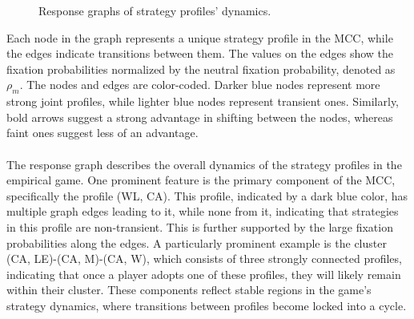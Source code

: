\begin{flushleft}
\begin{flushleft}
\begin{figure}[H]
            \caption{Response graphs of strategy profiles' dynamics.}
            \label{fig:response_graphs}
        \end{figure}

        Each node in the graph represents a unique strategy profile in the MCC, while the edges indicate transitions between them. The values on the edges show the fixation probabilities normalized by the neutral fixation probability, denoted as $\rho_m$. The nodes and edges are color-coded. Darker blue nodes represent more strong joint profiles, while lighter blue nodes represent transient ones. Similarly, bold arrows suggest a strong advantage in shifting between the nodes, whereas faint ones suggest less of an advantage.\\~\\

        The response graph describes the overall dynamics of the strategy profiles in the empirical game. One prominent feature is the primary component of the MCC, specifically the profile (WL, CA). This profile, indicated by a dark blue color, has multiple graph edges leading to it, while none from it, indicating that strategies in this profile are non-transient. This is further supported by the large fixation probabilities along the edges. A particularly prominent example is the cluster (CA, LE)-(CA, M)-(CA, W), which consists of three strongly connected profiles, indicating that once a player adopts one of these profiles, they will likely remain within their cluster. These components reflect stable regions in the game’s strategy dynamics, where transitions between profiles become locked into a cycle.\\~\\


\end{flushleft}
\end{flushleft}
